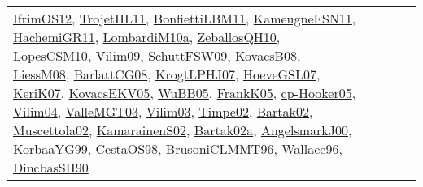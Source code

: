 {\begin{longtable}{lp{3cm}>{\raggedright}p{6cm}>{\raggedright}p{6cm}p{8cm}}
\href{papers/IfrimOS12.pdf}{IfrimOS12}\cite{IfrimOS12}, \href{articles/TrojetHL11.pdf}{TrojetHL11}\cite{TrojetHL11}, \href{papers/BonfiettiLBM11.pdf}{BonfiettiLBM11}\cite{BonfiettiLBM11}, \href{papers/KameugneFSN11.pdf}{KameugneFSN11}\cite{KameugneFSN11}, \href{articles/HachemiGR11.pdf}{HachemiGR11}\cite{HachemiGR11}, \href{articles/LombardiM10a.pdf}{LombardiM10a}\cite{LombardiM10a}, \href{articles/ZeballosQH10.pdf}{ZeballosQH10}\cite{ZeballosQH10}, \href{articles/LopesCSM10.pdf}{LopesCSM10}\cite{LopesCSM10}, \href{papers/Vilim09.pdf}{Vilim09}\cite{Vilim09}, \href{papers/SchuttFSW09.pdf}{SchuttFSW09}\cite{SchuttFSW09}, \href{articles/KovacsB08.pdf}{KovacsB08}\cite{KovacsB08}, \href{articles/LiessM08.pdf}{LiessM08}\cite{LiessM08}, \href{papers/BarlattCG08.pdf}{BarlattCG08}\cite{BarlattCG08}, \href{papers/KrogtLPHJ07.pdf}{KrogtLPHJ07}\cite{KrogtLPHJ07}, \href{papers/HoeveGSL07.pdf}{HoeveGSL07}\cite{HoeveGSL07}, \href{papers/KeriK07.pdf}{KeriK07}\cite{KeriK07}, \href{papers/KovacsEKV05.pdf}{KovacsEKV05}\cite{KovacsEKV05}, \href{papers/WuBB05.pdf}{WuBB05}\cite{WuBB05}, \href{papers/FrankK05.pdf}{FrankK05}\cite{FrankK05}, \href{papers/cp-Hooker05.pdf}{cp-Hooker05}\cite{cp-Hooker05}, \href{papers/Vilim04.pdf}{Vilim04}\cite{Vilim04}, \href{papers/ValleMGT03.pdf}{ValleMGT03}\cite{ValleMGT03}, \href{papers/Vilim03.pdf}{Vilim03}\cite{Vilim03}, \href{articles/Timpe02.pdf}{Timpe02}\cite{Timpe02}, \href{papers/Bartak02.pdf}{Bartak02}\cite{Bartak02}, \href{papers/Muscettola02.pdf}{Muscettola02}\cite{Muscettola02}, \href{papers/KamarainenS02.pdf}{KamarainenS02}\cite{KamarainenS02}, \href{papers/Bartak02a.pdf}{Bartak02a}\cite{Bartak02a}, \href{papers/AngelsmarkJ00.pdf}{AngelsmarkJ00}\cite{AngelsmarkJ00}, \href{papers/KorbaaYG99.pdf}{KorbaaYG99}\cite{KorbaaYG99}, \href{papers/CestaOS98.pdf}{CestaOS98}\cite{CestaOS98}, \href{papers/BrusoniCLMMT96.pdf}{BrusoniCLMMT96}\cite{BrusoniCLMMT96}, \href{articles/Wallace96.pdf}{Wallace96}\cite{Wallace96}, \href{articles/DincbasSH90.pdf}{DincbasSH90}\cite{DincbasSH90}\\

\end{longtable}}
